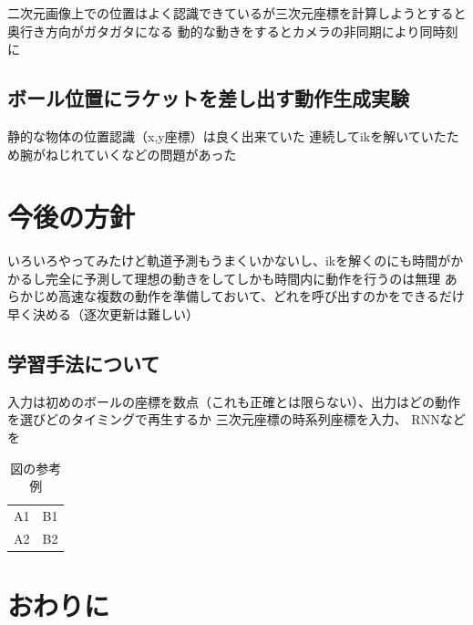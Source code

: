 \documentclass[twocolumn]{preport}
\begin{document}
二次元画像上での位置はよく認識できているが三次元座標を計算しようとすると奥行き方向がガタガタになる
動的な動きをするとカメラの非同期により同時刻に
\subsection{ボール位置にラケットを差し出す動作生成実験}
静的な物体の位置認識（x,y座標）は良く出来ていた
連続してikを解いていたため腕がねじれていくなどの問題があった

\section{今後の方針}
いろいろやってみたけど軌道予測もうまくいかないし、ikを解くのにも時間がかかるし完全に予測して理想の動きをしてしかも時間内に動作を行うのは無理
あらかじめ高速な複数の動作を準備しておいて、どれを呼び出すのかをできるだけ早く決める（逐次更新は難しい）
\subsection{学習手法について}
入力は初めのボールの座標を数点（これも正確とは限らない）、出力はどの動作を選びどのタイミングで再生するか
三次元座標の時系列座標を入力、
RNNなどを


\begin{table}[tbh]
 \begin{center}
  \begin{tabular}{|l|r|} \hline
  A1 & B1 \\
  A2 & B2 \\ \hline
  \end{tabular}
  \caption{図の参考例}
  \label{table:sample}
 \end{center}
\end{table}

\section{おわりに}



\end{document}
